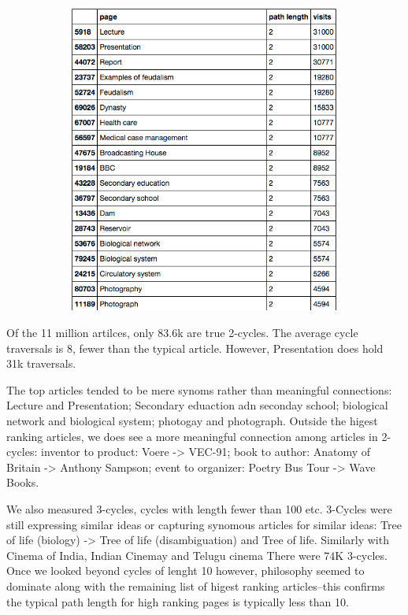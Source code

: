 \documentclass[twoside]{article}
\begin{document}
\begin{figure}[H]
\centering
\caption{highest ranking 2-Cycles}
    \begin{subfigure}[b]{0.8\textwidth}
        \includegraphics[width=\textwidth]{graphics/top_2loops.png}
    \end{subfigure}
\end{figure}

Of the 11 million artilces, only 83.6k are true 2-cycles. The average cycle traversals is 8, fewer than the typical article. However, Presentation does hold 31k traversals.

The top articles tended to be mere synoms rather than meaningful connections: Lecture and Presentation; Secondary eduaction adn seconday school; biological network and biological system; photogay and photograph. Outside the higest ranking articles, we does see a more meaningful connection among articles in 2-cycles: inventor to product: Voere -> VEC-91; book to author: Anatomy of Britain -> Anthony Sampson; event to organizer: Poetry Bus Tour -> Wave Books.

We also measured 3-cycles, cycles with length fewer than 100 etc. 3-Cycles were still expressing similar ideas or capturing synomous articles for similar ideas: Tree of life (biology) -> Tree of life (disambiguation) and Tree of life. Similarly with Cinema of India, Indian Cinemay and Telugu cinema  There were 74K 3-cycles. Once we looked beyond cycles of lenght 10 however, philosophy seemed to dominate along with the remaining list of higest ranking articles--this confirms the typical path length for high ranking pages is typically less than 10.
\end{document}
